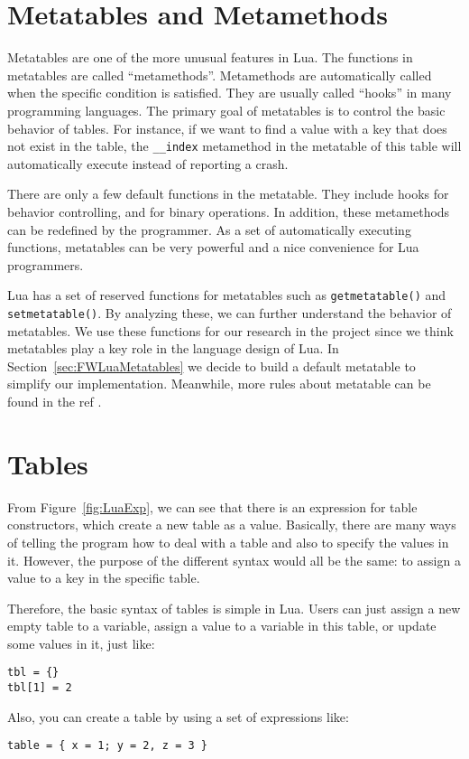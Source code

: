 \section{Metatables and Metamethods}
Metatables are one of the more unusual features in Lua. The functions in metatables are called ``metamethods''. Metamethods are automatically called when the specific condition is satisfied. They are usually called ``hooks'' in many programming languages. The primary goal of metatables is to control the basic behavior of tables. For instance, if we want to find a value with a key that does not exist in the table, the {\tt \_\_index} metamethod in the metatable of this table will automatically execute instead of reporting a crash.

There are only a few default functions in the metatable. They include hooks for behavior controlling, and for binary operations. In addition, these metamethods can be redefined by the programmer. As a set of automatically executing functions, metatables can be very powerful and a nice convenience for Lua programmers.

Lua has a set of reserved functions for metatables such as {\tt getmetatable()} and {\tt setmetatable()}. By analyzing these, we can further understand the behavior of metatables. We use these functions for our research in the project since we think metatables play a key role in the language design of Lua.
In Section~\ref{sec:FWLuaMetatables} we decide to build a default metatable to simplify our implementation. Meanwhile, more rules about metatable can be found in the ref \cite{LRM}.

\section{Tables}\label{sec: LuaTable}
From Figure~\ref{fig:LuaExp}, we can see that there is an expression for table constructors, which create a new table as a value. Basically, there are many ways of telling the program how to deal with a table and also to specify the values in it. However, the purpose of the different syntax would all be the same: to assign a value to a key in the specific table.

Therefore, the basic syntax of tables is simple in Lua. Users can just assign a new empty table to a variable, assign a value to a variable in this table, or update some values in it, just like:

\begin{verbatim}
tbl = {}
tbl[1] = 2 
\end{verbatim}
Also, you can create a table by using a set of expressions like:
\begin{verbatim}
table = { x = 1; y = 2, z = 3 } 
\end{verbatim}

